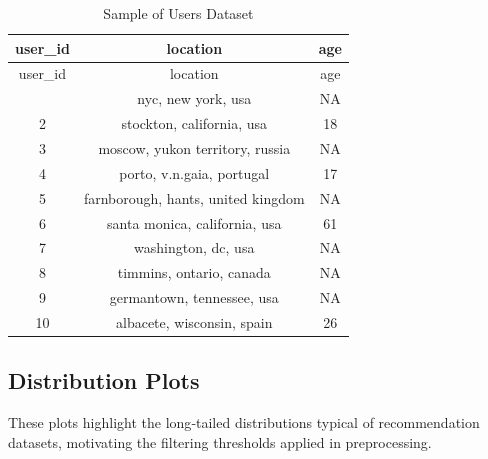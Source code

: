 \documentclass[
  12pt]{article}
\begin{document}
\begin{longtable}[]{@{}ccc@{}}
\caption{Sample of Users Dataset}\tabularnewline
\toprule\noalign{}
user\_id & location & age \\
\midrule\noalign{}
\endfirsthead
\toprule\noalign{}
user\_id & location & age \\
\midrule\noalign{}
\endhead
\bottomrule\noalign{}
\endlastfoot
1 & nyc, new york, usa & NA \\
2 & stockton, california, usa & 18 \\
3 & moscow, yukon territory, russia & NA \\
4 & porto, v.n.gaia, portugal & 17 \\
5 & farnborough, hants, united kingdom & NA \\
6 & santa monica, california, usa & 61 \\
7 & washington, dc, usa & NA \\
8 & timmins, ontario, canada & NA \\
9 & germantown, tennessee, usa & NA \\
10 & albacete, wisconsin, spain & 26 \\
\end{longtable}

\subsection{Distribution Plots}\label{sec-plot}

These plots highlight the long‑tailed distributions typical of
recommendation datasets, motivating the filtering thresholds applied in
preprocessing.
\end{document}
